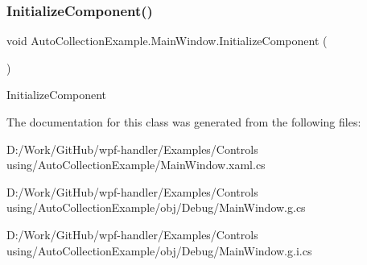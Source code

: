 \subsubsection{\texorpdfstring{Initialize\+Component()}{InitializeComponent()}\hspace{0.1cm}{\footnotesize\ttfamily [2/2]}}
{\footnotesize\ttfamily void Auto\+Collection\+Example.\+Main\+Window.\+Initialize\+Component (\begin{DoxyParamCaption}{ }\end{DoxyParamCaption})}



Initialize\+Component 



The documentation for this class was generated from the following files\+:\begin{DoxyCompactItemize}
\item 
D\+:/\+Work/\+Git\+Hub/wpf-\/handler/\+Examples/\+Controls using/\+Auto\+Collection\+Example/Main\+Window.\+xaml.\+cs\item 
D\+:/\+Work/\+Git\+Hub/wpf-\/handler/\+Examples/\+Controls using/\+Auto\+Collection\+Example/obj/\+Debug/Main\+Window.\+g.\+cs\item 
D\+:/\+Work/\+Git\+Hub/wpf-\/handler/\+Examples/\+Controls using/\+Auto\+Collection\+Example/obj/\+Debug/Main\+Window.\+g.\+i.\+cs\end{DoxyCompactItemize}
